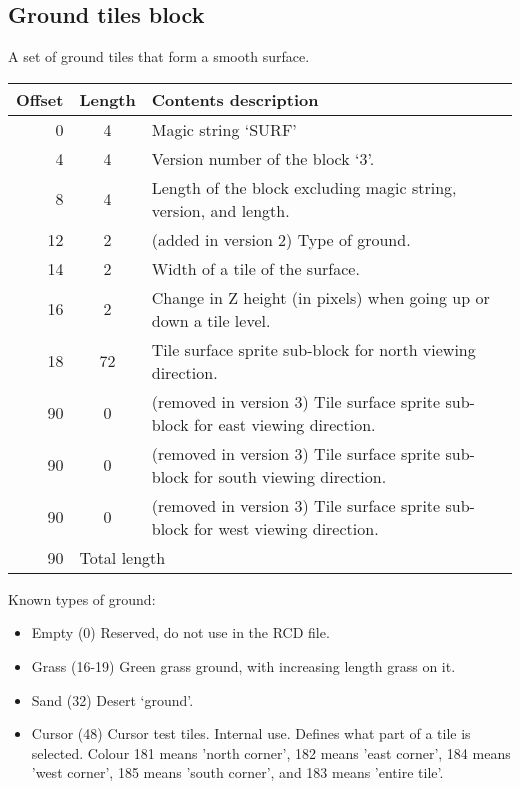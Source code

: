 \documentclass{article}
\begin{document}
\subsection{Ground tiles block}
A set of ground tiles that form a smooth surface.

\begin{center}
\begin{tabular}{|r|c|l|} \hline
\textbf{Offset} & \textbf{Length} & \textbf{Contents description} \\ \hline
   0 &  4 & Magic string `SURF' \\
   4 &  4 & Version number of the block `3'. \\
   8 &  4 & Length of the block excluding magic string, version, and length. \\
  12 &  2 & (added in version 2) Type of ground. \\
  14 &  2 & Width of a tile of the surface. \\
  16 &  2 & Change in Z height (in pixels) when going up or down a tile level. \\
  18 & 72 & Tile surface sprite sub-block for north viewing direction. \\
  90 &  0 & (removed in version 3) Tile surface sprite sub-block for east viewing direction. \\
  90 &  0 & (removed in version 3) Tile surface sprite sub-block for south viewing direction. \\
  90 &  0 & (removed in version 3) Tile surface sprite sub-block for west viewing direction. \\ \hline
  90 & \multicolumn{2}{l|}{Total length} \\ \hline
\end{tabular}
\end{center}

\medskip
\noindent
Known types of ground:
\begin{itemize}
\item Empty (0) Reserved, do not use in the RCD{} file.
\item Grass (16-19) Green grass ground, with increasing length grass on it.
\item Sand  (32) Desert `ground'.
\item Cursor (48) Cursor test tiles. Internal use. Defines what part of a tile
    is selected. Colour 181 means 'north corner', 182 means 'east corner', 184
    means 'west corner', 185 means 'south corner', and 183 means 'entire
    tile'.
\end{itemize}
\end{document}
